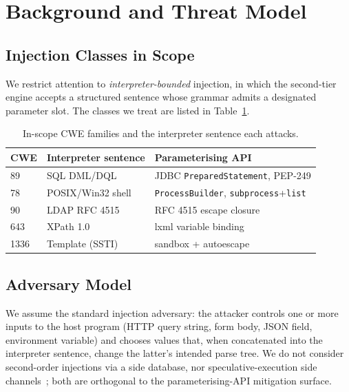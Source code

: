 \documentclass[conference]{IEEEtran}
\begin{document}
\section{Background and Threat Model}\label{sec:bg}

\subsection{Injection Classes in Scope}
We restrict attention to \emph{interpreter-bounded} injection, in
which the second-tier engine accepts a structured sentence whose
grammar admits a designated parameter slot.  The classes we treat
are listed in Table~\ref{tab:cwe}.

\begin{table}[t]
\caption{In-scope CWE families and the interpreter sentence each
attacks.}\label{tab:cwe}
\centering\small
\begin{tabular}{lll}
\toprule
CWE  & Interpreter sentence & Parameterising API \\
\midrule
89   & SQL DML/DQL          & JDBC \texttt{PreparedStatement}, PEP-249 \\
78   & POSIX/Win32 shell    & \texttt{ProcessBuilder}, \texttt{subprocess}+\texttt{list} \\
90   & LDAP RFC 4515        & RFC 4515 escape closure \\
643  & XPath 1.0            & lxml variable binding \\
1336 & Template (SSTI)      & sandbox + autoescape \\
\bottomrule
\end{tabular}
\end{table}

\subsection{Adversary Model}
We assume the standard injection adversary: the attacker controls
one or more inputs to the host program (HTTP query string, form body,
JSON field, environment variable) and chooses values that, when
concatenated into the interpreter sentence, change the latter's
intended parse tree. We do not consider second-order injections via
a side database, nor speculative-execution side
channels~\cite{nilizadeh_taintscope_2019}; both are orthogonal to the
parameterising-API mitigation surface.
\end{document}
